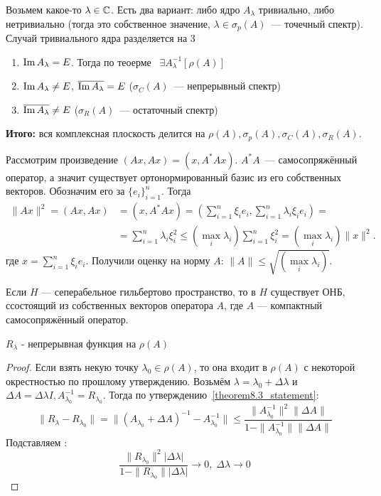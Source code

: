 \begin{unnecessary}
    Возьмем какое-то $\lambda \in \mathbb{C}$. Есть два вариант: либо ядро $A_\lambda$ тривиально, либо нетривиально (тогда это собственное значение, $\lambda \in \sigma_p(A)$~--- точечный спектр). Случай тривиального ядра разделяется на 3
    \begin{enumerate}
        \item $\operatorname{Im} A_\lambda=E$. Тогда по теоерме~ $\exists A_\lambda^{-1} \left[\rho(A)\right]$
        \item $\operatorname{Im} A_\lambda \neq E$, $\overline{\operatorname{Im} A_\lambda} = E$ ($\sigma_C(A)$~--- непрерывный спектр)
        \item $\overline{\operatorname{Im} A_\lambda} \neq E$ ($\sigma_R(A)$~--- остаточный спектр)
    \end{enumerate}
    
    \textbf{Итого:} вся комплексная плоскость делится на $\rho(A), \sigma_p(A), \sigma_C(A), \sigma_R(A)$.
    
    Рассмотрим произведение $(Ax, Ax)=(x, A^*Ax)$. $A^*A$~--- самосопряжённый оператор, а значит существует ортонормированный базис из его собственных векторов. Обозначим его за $\{e_i\}_{i=1}^n$. Тогда
    \begin{align*}
        \|Ax\|^2=(Ax, Ax) &= (x, A^*Ax) = (\sum\limits_{i = 1}^n \xi_i e_i, \sum\limits_{i = 1}^n \lambda_i \xi_i e_i )=\\
        &= \sum\limits_{i = 1}^n \lambda_i \xi_i^2 \leq (\max\limits_{i} \lambda_i) \sum\limits_{i = 1}^n \xi_i^2 = (\max\limits_{i} \lambda_i) \|x\|^2.
    \end{align*}
    где $x = \sum\limits_{i=1}^n \xi_i e_i$. Получили оценку на норму $A$: $\|A\| \leq \sqrt{(\max\limits_{i} \lambda_i)}$.
    
    \begin{theorem}\label{hilb-shmidt}
        Если $H$ --- сеперабельное гильбертово пространство, то в $H$ существует ОНБ, ссостоящий из собственных векторов оператора $A$, где $A$ --- компактный самосопряжённый оператор.
    \end{theorem}
\end{unnecessary}
\begin{statement}[$1$]
    $R_\lambda$ - непрерывная функция на $\rho(A)$
\end{statement}

\begin{proof}
    Если взять некую точку $\lambda_0 \in \rho(A)$, то она входит в $\rho(A)$ с некоторой окрестностью по прошлому утверждению. Возьмём $\lambda = \lambda_0 + \Delta \lambda$ и $\Delta A = \Delta \lambda I, A_{\lambda_0}^{-1} = R_{\lambda_0}$. Тогда по утверждению~\ref{theorem8.3_statement}:
    $$\|R_\lambda - R_{\lambda_0}\| = \|(A_{\lambda_0}+\Delta A)^{-1}-A_{\lambda_0}^{-1}\| \leqslant \frac{\|A_{\lambda_0}^{-1}\|^2 \|\Delta A \|}{1-\|A_{\lambda_0}^{-1}\| \|\Delta A\|}$$
    Подставляем :
    $$\frac{\|R_{\lambda_0} \|^2 |\Delta \lambda|}{1 - \| R_{\lambda_0}\| |\Delta \lambda|} \to 0, \; \Delta \lambda \to 0$$
\end{proof}

